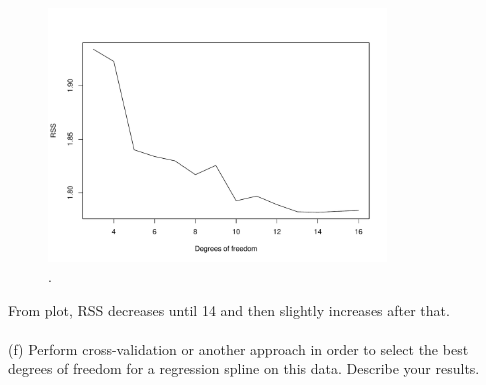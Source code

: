 \documentclass{article}
\begin{document}
\begin{figure}[htb]
	\begin{center}
		\includegraphics[width=0.8\textwidth]{MTH522_hw6_p3e.pdf}
	\end{center}
	\caption{.}
	\label{fig:MTH522_hw6_p3e}
\end{figure}


From plot, RSS decreases until 14 and then slightly increases after that.\\
\\
(f) Perform cross-validation or another approach in order to select the best degrees of freedom for a regression spline on this data. Describe your results.
\end{document}
